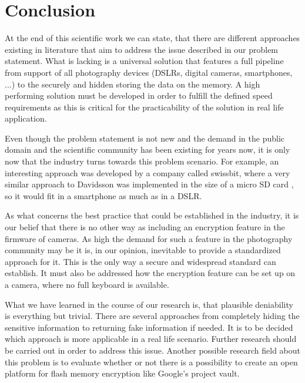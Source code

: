 \documentclass[12pt,a4paper,titlepage,oneside]{scrartcl}
\begin{document}
\newpage
\section{Conclusion}
At the end of this scientific work we can state, that there are different approaches existing in literature that aim to address the issue described in our problem statement.
What is lacking is a universal solution that features a full pipeline from support of all photography devices (DSLRs, digital cameras, smartphones, ...) to the securely and hidden storing the data on the memory.
A high performing solution must be developed in order to fulfill the defined speed requirements as this is critical for the practicability of the solution in real life application.

Even though the problem statement is not new and the demand in the public domain and the scientific community has been existing for years now, it is only now that the industry turns towards this problem scenario.
For example, an interesting approach was developed by a company called swissbit, where a very similar approach to Davidsson was implemented in the size of a micro SD card \cite{swissbit2017}, so it would fit in a smartphone as much as in a DSLR.

As what concerns the best practice that could be established in the industry, it is our belief that there is no other way as including an encryption feature in the firmware of cameras.
As high the demand for such a feature in the photography community may be it is, in our opinion, inevitable to provide a standardized approach for it.
This is the only way a secure and widespread standard can establish.
It must also be addressed how the encryption feature can be set up on a camera, where no full keyboard is available.

What we have learned in the course of our research is, that plausible deniability is everything but trivial.
There are several approaches from completely hiding the sensitive information to returning fake information if needed.
It is to be decided which approach is more applicable in a real life scenario.
Further research should be carried out in order to address this issue.
Another possible research field about this problem is to evaluate whether or not there is a possibility to create an open platform for flash memory encryption like Google's project vault.

\newpage

\listoftables

\newpage




\end{document}
